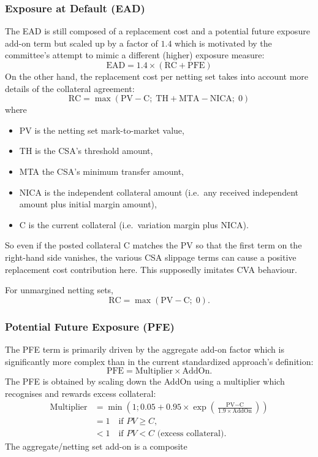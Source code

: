 \subsubsection{Exposure at Default (EAD)}
The EAD is still composed of a replacement cost and a potential future exposure add-on term
but scaled up by a factor of $1.4$ which is motivated by the committee's attempt
to mimic a different (higher) exposure measure:
$$
\text{EAD} = 1.4 \times (\text{RC} + \text{PFE})
$$
On the other hand, the replacement cost per netting set takes into account
more details of the collateral agreement: 
$$
\text{RC} = \max(\text{PV} - \text{C};\; \text{TH} + \text{MTA} - \text{NICA};\; 0)
$$
where 
\begin{itemize}
\item PV is the netting set mark-to-market value,
\item TH is the CSA's threshold amount, 
\item MTA the CSA's minimum transfer amount, 
\item NICA is the independent collateral  amount (i.e.\ any received independent 
amount plus initial margin amount),
\item C is the current collateral (i.e.\ variation margin plus NICA).
\end{itemize}
So even if the posted collateral C matches the PV so that the first
term on the right-hand side vanishes, the various CSA slippage
terms can cause a positive replacement cost contribution here. This
supposedly imitates CVA behaviour.

For unmargined netting sets,
\begin{equation*}
\text{RC} = \max(\text{PV} - \text{C};\; 0).
\end{equation*}

\subsubsection{Potential Future Exposure (PFE)}
The PFE term is primarily driven by the aggregate add-on factor
which is significantly more complex than in the current standardized approach's definition:
$$
\text{PFE} = \text{Multiplier} \times \text{AddOn}.
$$
The PFE is obtained by scaling down the AddOn using a multiplier which recognises and rewards excess collateral: 
\begin{align*}
\text{Multiplier} &= \min\left(1; 0.05 + 0.95 \times \exp\left(\frac{\text{PV}-\text{C}}{1.9
  \times \text{AddOn}} \right)\right)  \\
&=1 \quad \text{if $PV \geq C$}, \\
&<1 \quad \text{if $PV < C$ (excess collateral).} 
\end{align*}
The aggregate/netting set add-on is a composite

